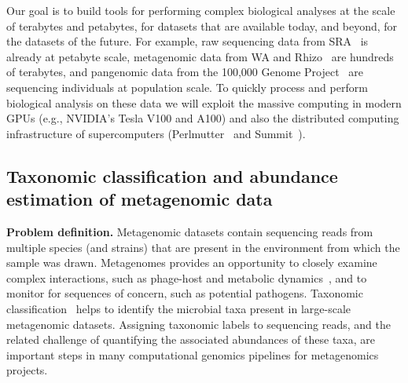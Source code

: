 
Our goal  is to build tools for performing complex biological analyses at the scale of terabytes and petabytes, for datasets that are available today, and beyond, for the datasets of the future. For example, raw sequencing data from SRA~\cite{kodama2012sequence} is already at petabyte scale, metagenomic data from WA and Rhizo~\cite{hofmeyr2020terabase} are hundreds of terabytes, and pangenomic data from the 100,000 Genome Project~\cite{1002021100} are sequencing individuals at population scale. To quickly process and perform biological analysis on these data we will exploit the massive computing in modern GPUs (e.g., NVIDIA's Tesla V100 and A100) and also the distributed computing infrastructure of supercomputers (Perlmutter~\cite{perlmutter} and Summit~\cite{summit}).


\subsection{Taxonomic classification and abundance estimation of metagenomic data}
\label{subsec:tax-class}

\textbf{Problem definition.}
Metagenomic datasets contain sequencing reads from multiple species (and strains) that are present in the environment from which the sample was drawn. Metagenomes provides an opportunity to closely examine complex interactions, such as phage-host and metabolic dynamics~\cite{national2007new}, and to monitor for sequences of concern, such as potential pathogens.
%
Taxonomic classification~\cite{wood2014kraken} helps to identify the microbial taxa present in large-scale metagenomic datasets. Assigning taxonomic labels to sequencing reads, and the related challenge of quantifying the associated abundances of these taxa, are important steps in many computational genomics pipelines for metagenomics projects.


